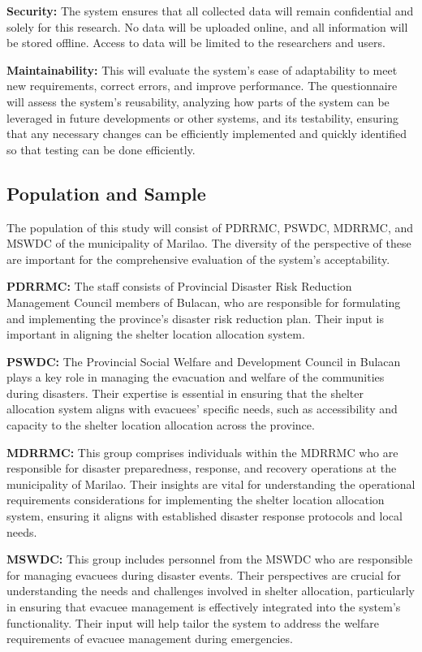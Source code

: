 	\textbf{Security:} The system ensures that all collected data will remain confidential and solely for this research. No data will be uploaded online, and all information will be stored offline. Access to data will be limited to the researchers and users.
	
	\textbf{Maintainability:} This will evaluate the system's ease of adaptability to meet new requirements, correct errors, and improve performance. The questionnaire will assess the system's reusability, analyzing how parts of the system can be leveraged in future developments or other systems, and its testability, ensuring that any necessary changes can be efficiently implemented and quickly identified so that testing can be done efficiently. 

\subsection{Population and Sample}
	The population of this study will consist of PDRRMC, PSWDC, MDRRMC, and MSWDC of the municipality of Marilao. The diversity of the perspective of these are important for the comprehensive evaluation of the system’s acceptability.
	
	\textbf{PDRRMC:} The staff consists of Provincial Disaster Risk Reduction Management Council members of Bulacan, who are responsible for formulating and implementing the province's disaster risk reduction plan. Their input is important in aligning the shelter location allocation system.
	
	\textbf{PSWDC:} The Provincial Social Welfare and Development Council in Bulacan plays a key role in managing the evacuation and welfare of the communities during disasters. Their expertise is essential in ensuring that the shelter allocation system aligns with evacuees' specific needs, such as accessibility and capacity to the shelter location allocation across the province.
	
	\textbf{MDRRMC:} This group comprises individuals within the MDRRMC who are responsible for disaster preparedness, response, and recovery operations at the municipality of Marilao. Their insights are vital for understanding the operational requirements considerations for implementing the shelter location allocation system, ensuring it aligns with established disaster response protocols and local needs.
	
	\textbf{MSWDC:}  This group includes personnel from the MSWDC who are responsible for managing evacuees during disaster events. Their perspectives are crucial for understanding the needs and challenges involved in shelter allocation, particularly in ensuring that evacuee management is effectively integrated into the system’s functionality. Their input will help tailor the system to address the welfare requirements of evacuee management during emergencies.
	
